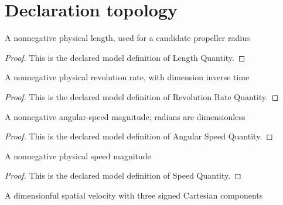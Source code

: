 \section{Declaration topology}
\begin{definition}
  \label{def:physics:phyx-mini-0818:phyxminiproblems-problemphyxmini0818-lengthquantity}
  A nonnegative physical length, used for a candidate propeller radius
\end{definition}
\begin{proof}
  This is the declared model definition of Length Quantity.
\end{proof}
\begin{definition}
  \label{def:physics:phyx-mini-0818:phyxminiproblems-problemphyxmini0818-revolutionratequantity}
  A nonnegative physical revolution rate, with dimension inverse time
\end{definition}
\begin{proof}
  This is the declared model definition of Revolution Rate Quantity.
\end{proof}
\begin{definition}
  \label{def:physics:phyx-mini-0818:phyxminiproblems-problemphyxmini0818-angularspeedquantity}
  A nonnegative angular-speed magnitude; radians are dimensionless
\end{definition}
\begin{proof}
  This is the declared model definition of Angular Speed Quantity.
\end{proof}
\begin{definition}
  \label{def:physics:phyx-mini-0818:phyxminiproblems-problemphyxmini0818-speedquantity}
  A nonnegative physical speed magnitude
\end{definition}
\begin{proof}
  This is the declared model definition of Speed Quantity.
\end{proof}
\begin{definition}
  \label{def:physics:phyx-mini-0818:phyxminiproblems-problemphyxmini0818-spatialvelocityquantity}
  A dimensionful spatial velocity with three signed Cartesian components
\end{definition}
